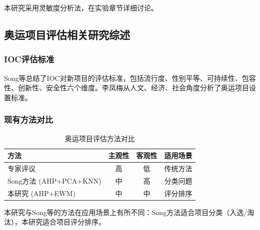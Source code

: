 本研究采用灵敏度分析法，在实验章节详细讨论。

\subsection{奥运项目评估相关研究综述}

\subsubsection{IOC评估标准}

Song等\cite{song2025quantifying}总结了IOC对新项目的评估标准，包括流行度、性别平等、可持续性、包容性、创新性、安全性六个维度。李凤梅\cite{li2013xiaji}从人文、经济、社会角度分析了奥运项目设置标准。

\subsubsection{现有方法对比}

\begin{table}[htbp]
\centering
\caption{奥运项目评估方法对比}
\label{tab:method_comparison}
\begin{tabular}{lccc}
\toprule
方法 & 主观性 & 客观性 & 适用场景 \\
\midrule
专家评议 & 高 & 低 & 传统方法 \\
Song方法 (AHP+PCA+KNN) & 中 & 高 & 分类问题 \\
本研究 (AHP+EWM) & 中 & 中 & 评分排序 \\
\bottomrule
\end{tabular}
\end{table}

本研究与Song等\cite{song2025quantifying}的方法在应用场景上有所不同：Song方法适合项目分类（入选/淘汰），本研究适合项目评分排序。
